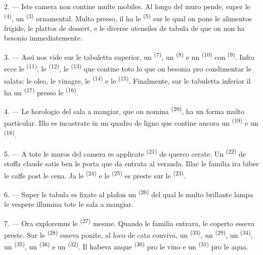2. --- Iste camera non contine multe mobiles. Al longo del muro pende, super le
 \textsuperscript{(4)}, un 
\textsuperscript{(3)} ornamental. Multo presso, il ha le 
\textsuperscript{(5)} sur le qual on pone le alimentos frigide, le plattos de
dessert, e le diverse utensiles de tabula de que on non ha besonio
immediatemente.

3. --- Assi nos vide sur le tabuletta superior, un 
\textsuperscript{(7)}, un  \textsuperscript{(8)} e un
 \textsuperscript{(10)} con 
\textsuperscript{(9)}. Infra ecce le  \textsuperscript{(11)}, le
 \textsuperscript{(12)}, le 
\textsuperscript{(13)} que contine toto lo que on besonia pro condimentar le
salata: le oleo, le vinagre, le  \textsuperscript{(14)} e le
 \textsuperscript{(15)}. Finalmente, sur le tabuletta inferior il
ha un  \textsuperscript{(17)} presso le 
\textsuperscript{(16)}.

4. --- Le horologio del sala a mangiar, que on nomina 
\textsuperscript{(20)}, ha un forma multo particular. Illo es incastrate in un
quadro de ligno que contine ancora un 
\textsuperscript{(19)} e un  \textsuperscript{(18)}.

\VUsaut{4.6mm}
\VUsaut{3.0mm}

5. --- A tote le muros del camera es applicate 
\textsuperscript{(21)} de querco cerate. Un 
\textsuperscript{(22)} de stoffa claude satis ben le porta que da entrata al
veranda. Illac le familia ira biber le caffe post le cena. Ja le 
\textsuperscript{(24)} e le  \textsuperscript{(25)} es preste
sur le  \textsuperscript{(23)}.

6. --- Super le tabula es fixate al plafon un 
\textsuperscript{(26)} del qual le multo brillante lampa le vespere illumina
tote le sala a mangiar.

7. --- Ora exploremus le  \textsuperscript{(27)} mesme.
Quando le familia entrava, le coperto esseva preste. Sur le 
\textsuperscript{(28)} esseva ponite, al loco de cata conviva, un
 \textsuperscript{(33)}, un 
\textsuperscript{(29)}, un  \textsuperscript{(34)}, un
 \textsuperscript{(35)}, un 
\textsuperscript{(36)} e un  \textsuperscript{(32)}. Il habeva
anque  \textsuperscript{(30)} pro le vino e un
 \textsuperscript{(31)} pro le aqua.

